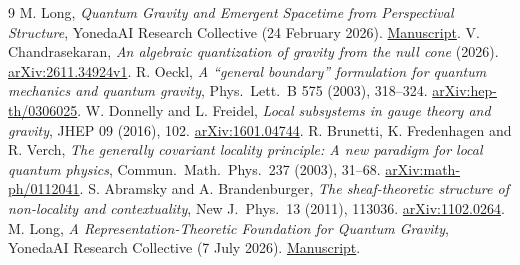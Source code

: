 \documentclass[11pt,letterpaper]{article}
\begin{document}
\begin{thebibliography}{9}
M. Long, \emph{Quantum Gravity and Emergent Spacetime from Perspectival
Structure}, YonedaAI Research Collective (24 February 2026).
\href{https://yonedaai.com/papers/pdf/quantum-gravity-emergent-spacetime.pdf}{Manuscript}.
V. Chandrasekaran, \emph{An algebraic quantization of gravity from the null
cone} (2026). \href{https://arxiv.org/abs/2611.34924v1}{arXiv:2611.34924v1}.
R. Oeckl, \emph{A ``general boundary'' formulation for quantum mechanics and
quantum gravity}, Phys.\ Lett.\ B 575 (2003), 318--324.
\href{https://arxiv.org/abs/hep-th/0306025}{arXiv:hep-th/0306025}.
W. Donnelly and L. Freidel, \emph{Local subsystems in gauge theory and
gravity}, JHEP 09 (2016), 102.
\href{https://arxiv.org/abs/1601.04744}{arXiv:1601.04744}.
R. Brunetti, K. Fredenhagen and R. Verch, \emph{The generally covariant
locality principle: A new paradigm for local quantum physics},
Commun.\ Math.\ Phys.\ 237 (2003), 31--68.
\href{https://arxiv.org/abs/math-ph/0112041}{arXiv:math-ph/0112041}.
S. Abramsky and A. Brandenburger, \emph{The sheaf-theoretic structure of
non-locality and contextuality}, New J.\ Phys.\ 13 (2011), 113036.
\href{https://arxiv.org/abs/1102.0264}{arXiv:1102.0264}.
M. Long, \emph{A Representation-Theoretic Foundation for Quantum Gravity},
YonedaAI Research Collective (7 July 2026).
\href{https://yonedaai.com/papers/pdf/library/condensed-representation/part6-condensed-quantum-gravity.pdf}{Manuscript}.
\end{thebibliography}
\end{document}
